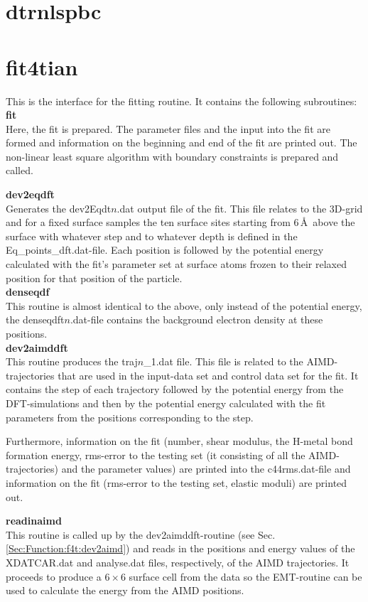 \documentclass[twoside, 11pt, titlepage, captions=nooneline, a4paper, headsepline]{scrbook}%
\newcommand{\9}{\mathrm}
\newcommand{\0}{\,\mathrm}
\begin{document}
\section{dtrnlspbc}
\section{fit4tian}
This is the interface for the fitting routine. It contains the following subroutines:
\textbf{fit}\\
Here, the fit is prepared. The parameter files and the input into the fit are formed and information on the beginning and end of the fit are printed out. The non-linear least square algorithm with boundary constraints is prepared and called.
 
\noindent\textbf{dev2eqdft}\\
Generates the dev2Eqdt$n$.dat output file of the fit. This file relates to the 3D-grid and for a fixed surface samples the ten surface sites starting from 6\,\AA~above the surface with whatever step and to whatever depth is defined in the Eq\_points\_dft.dat-file. Each position is followed by the potential energy calculated with the fit's parameter set at surface atoms frozen to their relaxed position for that position of the particle.\\
\textbf{denseqdf}\\
This routine is almost identical to the above, only instead of the potential energy, the denseqdft$n$.dat-file contains the background electron density at these positions.\\
\textbf{dev2aimddft}\\
\label{Sec:Function:f4t:dev2aimd}
This routine produces the traj$n$\_1.dat file. This file is related to the AIMD-trajectories that are used in the input-data set and control data set for the fit. It contains the step of each trajectory followed by the potential energy from the DFT-simulations and then by the potential energy calculated with the fit parameters from the positions corresponding to the step.

Furthermore, information on the fit (number, shear modulus, the H-metal bond formation energy, rms-error to the testing set (it consisting of all the AIMD-trajectories) and the parameter values) are printed into the c44rms.dat-file and information on the fit (rms-error to the testing set, elastic moduli) are printed out.

\textbf{readinaimd}\\
This routine is called up by the dev2aimddft-routine (see Sec.\,\ref{Sec:Function:f4t:dev2aimd}) and reads in the positions and energy values of the XDATCAR.dat and analyse.dat files, respectively, of the AIMD trajectories. It proceeds to produce a $6\times6$ surface cell from the data so the EMT-routine can be used to calculate the energy from the AIMD positions.
\end{document}
